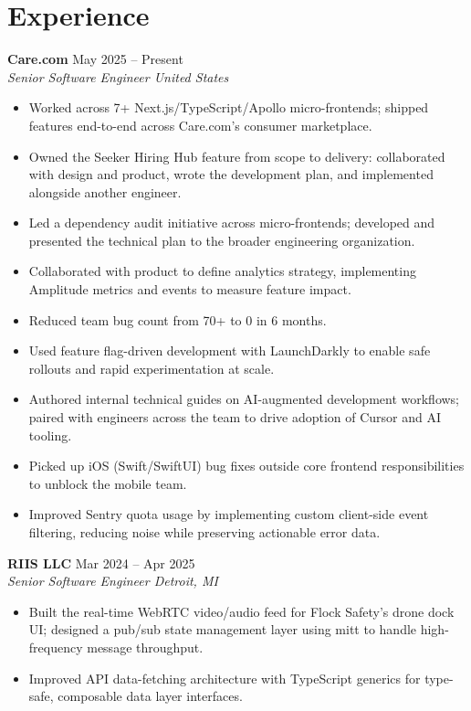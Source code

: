 \documentclass[11pt,letterpaper]{article}
\newcommand{\entry}[4]{%
  {\small\bfseries #1} \hfill {\footnotesize\color{light}#2} \\[-1pt]
  {\footnotesize\itshape #3 \hfill #4} \\[-4pt]
}
\begin{document}
\section*{Experience}

\entry{Care.com}{May 2025 -- Present}{Senior Software Engineer}{United States}
\begin{itemize}[nosep]
  \item {\small Worked across 7+ Next.js/TypeScript/Apollo micro-frontends; shipped features end-to-end across Care.com's consumer marketplace.}
  \item {\small Owned the Seeker Hiring Hub feature from scope to delivery: collaborated with design and product, wrote the development plan, and implemented alongside another engineer.}
  \item {\small Led a dependency audit initiative across micro-frontends; developed and presented the technical plan to the broader engineering organization.}
  \item {\small Collaborated with product to define analytics strategy, implementing Amplitude metrics and events to measure feature impact.}
  \item {\small Reduced team bug count from 70+ to 0 in 6 months.}
  \item {\small Used feature flag-driven development with LaunchDarkly to enable safe rollouts and rapid experimentation at scale.}
  \item {\small Authored internal technical guides on AI-augmented development workflows; paired with engineers across the team to drive adoption of Cursor and AI tooling.}
  \item {\small Picked up iOS (Swift/SwiftUI) bug fixes outside core frontend responsibilities to unblock the mobile team.}
  \item {\small Improved Sentry quota usage by implementing custom client-side event filtering, reducing noise while preserving actionable error data.}
\end{itemize}

\vspace{2pt}
\entry{RIIS LLC}{Mar 2024 -- Apr 2025}{Senior Software Engineer}{Detroit, MI}
\begin{itemize}[nosep]
  \item {\small Built the real-time WebRTC video/audio feed for Flock Safety's drone dock UI; designed a pub/sub state management layer using mitt to handle high-frequency message throughput.}
  \item {\small Improved API data-fetching architecture with TypeScript generics for type-safe, composable data layer interfaces.}
\end{itemize}
\end{document}
